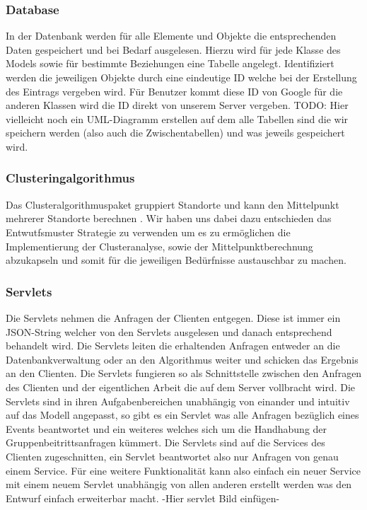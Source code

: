 	\subsubsection{Database}
	In der Datenbank werden für alle Elemente und Objekte die entsprechenden Daten gespeichert und bei Bedarf ausgelesen. Hierzu wird für jede Klasse des Models sowie für bestimmte Beziehungen eine Tabelle angelegt.
Identifiziert werden die jeweiligen Objekte durch eine eindeutige ID welche bei der Erstellung des Eintrags vergeben wird.
Für Benutzer kommt diese ID von Google für die anderen Klassen wird die ID direkt von unserem Server vergeben.
TODO: Hier vielleicht noch ein UML-Diagramm erstellen auf dem alle Tabellen sind die wir speichern werden (also auch die Zwischentabellen) und was jeweils gespeichert wird.

	\subsubsection{Clusteringalgorithmus}
	Das Clusteralgorithmuspaket gruppiert Standorte und kann den Mittelpunkt mehrerer Standorte berechnen . Wir haben uns dabei dazu entschieden das Entwutfsmuster Strategie zu verwenden um es zu ermöglichen die Implementierung der Clusteranalyse, sowie der Mittelpunktberechnung abzukapseln und somit für die jeweiligen Bedürfnisse austauschbar zu machen.

	\subsubsection{Servlets}
	Die Servlets nehmen die Anfragen der Clienten entgegen. Diese ist immer ein JSON-String welcher von den Servlets ausgelesen und danach entsprechend behandelt wird. Die Servlets leiten die erhaltenden Anfragen entweder an die Datenbankverwaltung oder an den Algorithmus weiter und schicken das Ergebnis an den Clienten.
Die Servlets fungieren so als Schnittstelle zwischen den Anfragen des Clienten und der eigentlichen Arbeit die auf dem Server vollbracht wird. 
Die Servlets sind in ihren Aufgabenbereichen unabhängig von einander und intuitiv auf das Modell angepasst, so gibt es ein Servlet was alle Anfragen bezüglich eines Events beantwortet und ein weiteres welches sich um die Handhabung der Gruppenbeitrittsanfragen kümmert.
Die Servlets sind auf die Services des Clienten zugeschnitten, ein Servlet beantwortet also nur Anfragen von genau einem Service.
Für eine weitere Funktionalität kann also einfach ein neuer Service mit einem neuem Servlet unabhängig von allen anderen erstellt werden was den Entwurf einfach erweiterbar macht.   
-Hier servlet Bild einfügen-

